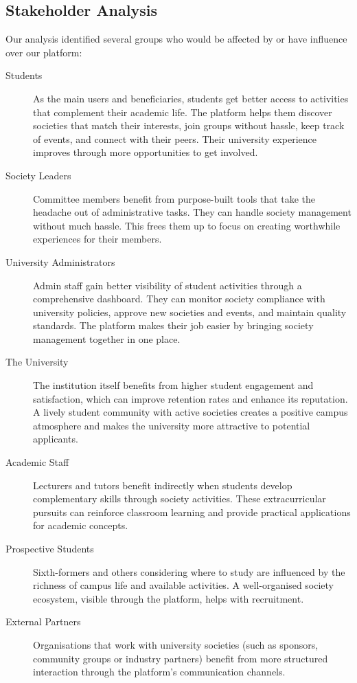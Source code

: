 \subsection{Stakeholder Analysis}
Our analysis identified several groups who would be affected by or have influence over our platform:
\begin{description}
    \item[Students] As the main users and beneficiaries, students get better access to activities that complement their academic life. The platform helps them discover societies that match their interests, join groups without hassle, keep track of events, and connect with their peers. Their university experience improves through more opportunities to get involved.
    \item[Society Leaders] Committee members benefit from purpose-built tools that take the headache out of administrative tasks. They can handle  society management without much hassle. This frees them up to focus on creating worthwhile experiences for their members.
    
    \item[University Administrators] Admin staff gain better visibility of student activities through a comprehensive dashboard. They can monitor society compliance with university policies, approve new societies and events, and maintain quality standards. The platform makes their job easier by bringing society management together in one place.
    
    \item[The University] The institution itself benefits from higher student engagement and satisfaction, which can improve retention rates and enhance its reputation. A lively student community with active societies creates a positive campus atmosphere and makes the university more attractive to potential applicants.
    
    \item[Academic Staff] Lecturers and tutors benefit indirectly when students develop complementary skills through society activities. These extracurricular pursuits can reinforce classroom learning and provide practical applications for academic concepts.
    
    \item[Prospective Students] Sixth-formers and others considering where to study are influenced by the richness of campus life and available activities. A well-organised society ecosystem, visible through the platform, helps with recruitment.
    
    \item[External Partners] Organisations that work with university societies (such as sponsors, community groups or industry partners) benefit from more structured interaction through the platform's communication channels.
\end{description}
